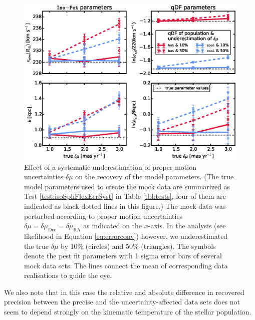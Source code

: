 \begin{figure}[!htbp]
\centering
\includegraphics[width=\columnwidth]{figs/isoSphFlexErrSyst_offset_vs_error.eps}
\caption{Effect of a systematic underestimation of proper motion uncertainties $\delta \mu$ on the recovery of the model parameters. (The true model parameters used to create the mock data are summarized as Test \ref{test:isoSphFlexErrSyst} in Table \ref{tbl:tests}, four of them are indicated as black dotted lines in this figure.) The mock data was perturbed according to proper motion uncertainties $\delta \mu = \delta \mu_\text{Dec} = \delta \mu_\text{RA}$ as indicated on the $x$-axis. In the \RM{} analysis (see likelihood in Equation \ref{eq:errorconv}) however, we underestimated the true $\delta \mu$ by 10\% (circles) and 50\% (triangles). The symbols denote the pest fit parameters with 1 sigma error bars of several mock data sets. The lines connect the mean of corresponding data realisations to guide the eye.}
\label{fig:isoSphFlexErrSyst}
\end{figure}



We also note that in this case the relative and absolute difference in recovered precision between the precise and the uncertainty-affected data sets does not seem to depend strongly on the kinematic temperature of the stellar population.

